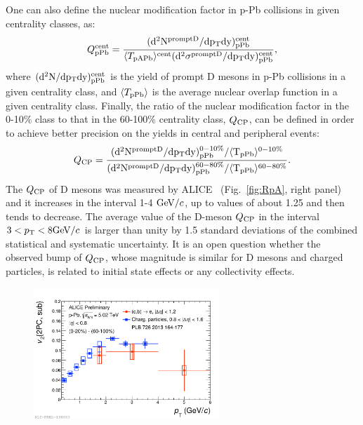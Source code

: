 One can also define the nuclear modification factor in p-Pb collisions in given centrality classes, as:
\begin{equation}
Q_{\rm pPb}^{\rm cent} = \frac{(\rm d^2 N^{\rm prompt D }/\rm d p_{\rm T} \rm d y)^{\rm cent}_{\rm pPb}}{\langle T_{\rm pAPb} \rangle ^{\rm cent}(\rm d^2 \sigma^{\rm prompt D }/\rm d p_{\rm T} \rm d y)^{\rm cent}_{\rm pPb}},
\end{equation}
where $(\rm d^2 N/\rm d p_{\rm T} \rm d y)^{\rm cent}_{\rm pPb}$ is the yield of prompt D mesons in p-Pb collisions 
in a given centrality class, and $\langle T_{\rm pPb} \rangle$ is the average nuclear overlap function in a given centrality class.
Finally, the ratio of the nuclear modification factor in the 0-10\% class to that in the 60-100\% centrality
class, $Q_{\rm CP}$, can be defined in order to achieve better precision on the yields in central and peripheral events:
\begin{equation}
Q_{\rm CP} = \frac{(\rm d^2 N^{\rm prompt D }/\rm d p_{\rm T} \rm d y)^{\rm 0-10\%}_{\rm pPb}/ \langle T_{\rm pPb} \rangle^{0-10\%}}{(\rm d^2 N^{\rm prompt D }/\rm d p_{\rm T} \rm d y)^{\rm 60-80\%}_{\rm pPb}/ \langle T_{\rm pPb} \rangle^{60-80\%}}.
\label{eq:QCP}
\end{equation}
The $Q_{\rm CP}$ of D mesons was measured by ALICE~\cite{ALICEPAS2017008} (Fig.~\ref{fig:RpA}, right panel) and it increases in the interval 1-4 $\mathrm{GeV}/c$, 
up to values of about 1.25 and then tends to decrease. The average value of the D-meson $Q_{\rm CP}$ 
in the interval $3 < p_{\rm T} < 8 \mathrm{GeV}/c$ is larger than unity by 1.5 standard deviations of the combined statistical and systematic uncertainty.
It is an open question whether the observed bump of $Q_{\rm CP}$, whose magnitude is similar 
for D mesons and charged particles, is related to initial state effects or any collectivity effects.

\begin{figure}[!ht]
  \centering
  \includegraphics[width=7cm]{FigCap2/v2HFE.pdf}
  \caption{~\cite{Acharya:2017hdv}}
  \label{fig:}
\end{figure}

